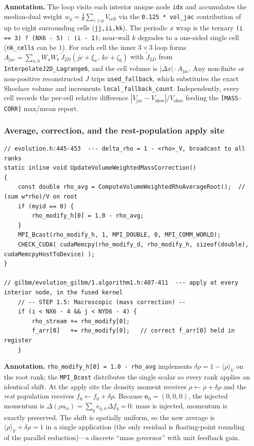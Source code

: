 \documentclass[11pt]{article}
\theoremstyle{definition}
\theoremstyle{remark}
\begin{document}
\noindent\textbf{Annotation.} The loop visits each interior unique node \texttt{idx}
and accumulates the median-dual weight $w_p=\tfrac18\sum_{c\ni p}V_{\text{cell}}$ via
the \texttt{0.125 * vol\_jac} contribution of up to eight surrounding cells
(\texttt{jj,ii,kk}). The periodic $x$ wrap is the ternary
\texttt{(i == 3) ? (NX6 - 5) : (i - 1)}; near-wall $k$ degrades to a one-sided
single cell (\texttt{nk\_cells} can be $1$). For each cell the inner $3\times3$ loop
forms $A_{\text{jac}}=\sum_{a,b}W_aW_b\,\tilde J_{2D}(jc{+}\xi_a,\ kc{+}\zeta_b)$ with
$\tilde J_{2D}$ from \texttt{InterpolateJ2D\_Lagrange6}, and the cell volume is
$|\Delta x|\cdot A_{\text{jac}}$. Any non-finite or non-positive reconstructed $J$
trips \texttt{used\_fallback}, which substitutes the exact Shoelace volume and
increments \texttt{local\_fallback\_count}. Independently, every cell records the
per-cell relative difference $|V_{\text{jac}}-V_{\text{shoe}}|/V_{\text{shoe}}$
feeding the \texttt{[MASS-CORR]} max/mean report.

\subsubsection{Average, correction, and the rest-population apply site}

\begin{lstlisting}[caption={Correction scalar, broadcast, and the rest-population apply site (\texttt{evolution.h}:445--453; \texttt{gilbm/evolution\_gilbm/1.algorithm1.h}:407--411).}]
// evolution.h:445-453  --- delta_rho = 1 - <rho>_V, broadcast to all ranks
static inline void UpdateVolumeWeightedMassCorrection()
{
    const double rho_avg = ComputeVolumeWeightedRhoAverageRoot();  // (sum w*rho)/V on root
    if (myid == 0) {
        rho_modify_h[0] = 1.0 - rho_avg;
    }
    MPI_Bcast(rho_modify_h, 1, MPI_DOUBLE, 0, MPI_COMM_WORLD);
    CHECK_CUDA( cudaMemcpy(rho_modify_d, rho_modify_h, sizeof(double), cudaMemcpyHostToDevice) );
}

// gilbm/evolution_gilbm/1.algorithm1.h:407-411  --- apply at every interior node, in the fused kernel
    // -- STEP 1.5: Macroscopic (mass correction) --
    if (i < NX6 - 4 && j < NYD6 - 4) {
        rho_stream += rho_modify[0];
        f_arr[0]   += rho_modify[0];   // correct f_arr[0] held in register
    }
\end{lstlisting}

\noindent\textbf{Annotation.} \texttt{rho\_modify\_h[0] = 1.0 - rho\_avg}
implements $\delta\rho=1-\langle\rho\rangle_V$ on the root rank; the
\texttt{MPI\_Bcast} distributes the single scalar so every rank applies an
identical shift. At the apply site the density moment receives
$\rho\!\leftarrow\!\rho+\delta\rho$ and the \emph{rest} population receives
$f_0\!\leftarrow\!f_0+\delta\rho$. Because $\mathbf e_0=(0,0,0)$, the injected
momentum is $\Delta(\rho u_\alpha)=\sum_q e_{q,\alpha}\Delta f_q=0$: mass is
injected, momentum is exactly preserved. The shift is spatially uniform, so the new
average is $\langle\rho\rangle_V+\delta\rho=1$ in a single application (the only
residual is floating-point rounding of the parallel reduction)---a discrete ``mass
governor'' with unit feedback gain.
\end{document}
